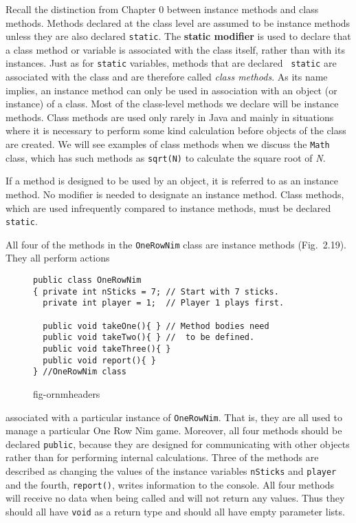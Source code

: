 Recall the distinction from Chapter 0 between instance methods and
class methods. Methods declared at the class level are assumed to be
instance methods unless they are also declared {\tt static}.  The {\bf
static modifier} is used to declare that a class method or variable is
associated with the class itself, rather than with its instances. 
Just as for {\tt static} variables, methods that are declared {\tt
static} are associated with the class and are therefore called {\it
class methods}.  As its name implies, an instance method can only be
used in association with an object (or instance) of a class. Most of
the class-level methods we declare will be instance methods. Class
methods are used only rarely in Java and mainly in situations where it
is necessary to perform some kind calculation before objects of the
class are created. We will see examples of class methods when we
discuss the {\tt Math} class, which has such methods as {\tt sqrt(N)}
to calculate the square root of {\it N}.

 {If a method is
designed to be used by an object, it is referred to as an instance
method. No modifier is needed to designate an instance method. Class
methods, which are used infrequently compared to instance methods,
must be declared {\tt static}.}

\noindent All four of the methods in the {\tt OneRowNim} class are
instance methods (Fig.~2.19). They all perform actions
\begin{figure}[hbt]
\jjjprogstart
\begin{jjjlisting}
\begin{lstlisting}
public class OneRowNim 
{ private int nSticks = 7; // Start with 7 sticks.
  private int player = 1;  // Player 1 plays first.

  public void takeOne(){ } // Method bodies need
  public void takeTwo(){ } //  to be defined.
  public void takeThree(){ }
  public void report(){ }
} //OneRowNim class
\end{lstlisting}
\end{jjjlisting}
{fig-ornmheaders}
\end{figure}
associated with a particular instance of {\tt OneRowNim}. That is,
they are all used to manage a particular One Row Nim game.  Moreover,
all four methods should be declared {\tt public}, because they are
designed for communicating with other objects rather than for
performing internal calculations. Three of the methods are described
as changing the values of the instance variables {\tt nSticks} and
{\tt player} and the fourth, {\tt report()}, writes information to the
console.  All four methods will receive no data when being called and
will not return any values.  Thus they should all have {\tt void} as a
return type and should all have empty parameter lists. 

